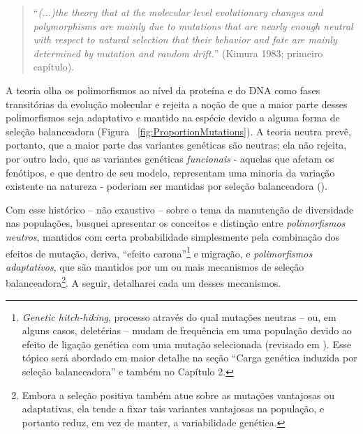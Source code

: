 \begin{refsection}
    \medskip

     \begin{quote} \enquote{\emph{(...)the theory that at the molecular level evolutionary changes and polymorphisms are mainly due to mutations that are nearly enough neutral with respect to natural selection that their behavior and fate are mainly determined by mutation and random drift.}} (Kimura 1983; primeiro capítulo). \end{quote}
%
\medskip

    A teoria olha os polimorfismos ao nível da proteína e do DNA como fases transitórias da evolução molecular e rejeita a noção de que a maior parte desses polimorfismos seja adaptativo e mantido na espécie devido a alguma forma de seleção balanceadora (Figura ~\ref{fig:ProportionMutations}). 	A teoria neutra prevê, portanto, que a maior parte das variantes genéticas são neutras; ela não rejeita, por outro lado, que as variantes genéticas \emph{funcionais} - aquelas que afetam os fenótipos, e que dentro de seu modelo, representam uma minoria da variação existente na natureza - poderiam ser mantidas por seleção balanceadora (\cite{Kimura1983,Gloss2016}).
%

	Com esse histórico -- não exaustivo -- sobre o tema da manutenção de diversidade nas populações, busquei apresentar os conceitos e distinção entre \emph{polimorfismos neutros}, mantidos com certa probabilidade simplesmente pela combinação dos efeitos de mutação, deriva, \enquote{efeito carona}\footnote{\emph{Genetic hitch-hiking}, processo através do qual mutações neutras -- ou, em alguns casos, deletérias -- mudam de frequência em uma população devido ao efeito de ligação genética com uma mutação selecionada (revisado em \cite{Cutter2013}). Esse tópico será abordado em maior detalhe na seção \enquote{Carga genética induzida por seleção balanceadora} e também no Capítulo 2.} e migração, e \emph{polimorfismos adaptativos}, que são mantidos por um ou mais mecanismos de seleção balanceadora\footnote{Embora a seleção positiva também atue sobre as mutações vantajosas ou adaptativas, ela tende a fixar tais variantes vantajosas na população, e portanto reduz, em vez de manter, a variabilidade genética.}. A seguir, detalharei cada um desses mecanismos. 
%
%

\end{refsection}
